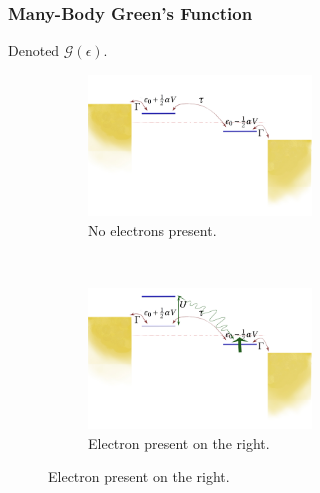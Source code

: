 \begin{frame}
    \frametitle{Many-Body Green's Function} 
    Denoted $\mathscr{G}(\epsilon)$.
    \begin{figure}[!b]  
        \begin{subfigure}{0.45\textwidth}\centering
            \includegraphics[clip=true,trim=0cm 1cm 0cm 0cm, width=0.65\textwidth]{fig/non_interacting_schematics.pdf}
            \caption{No electrons present.}
        \end{subfigure}~ 
        \begin{subfigure}{0.45\textwidth}\centering
            \includegraphics[clip=true,trim=0cm 1cm 0cm 0cm, width=0.65\textwidth]{fig/interacting_schematics.pdf}
            \caption{Electron present on the right.}
        \end{subfigure}
        

\end{figure}
\end{frame}
